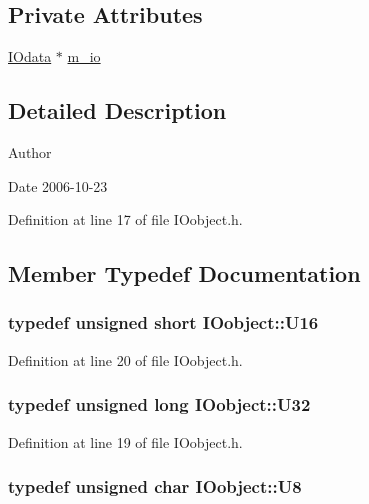 \subsection*{Private Attributes}
\begin{DoxyCompactItemize}
\item 
\hyperlink{classIOdata}{IOdata} $\ast$ \hyperlink{classIOobject_aa648e4128c3c37d8291d6bb26b57c504}{m\_\-io}
\end{DoxyCompactItemize}


\subsection{Detailed Description}
\begin{DoxyAuthor}{Author}

\end{DoxyAuthor}
\begin{DoxyDate}{Date}
2006-\/10-\/23 
\end{DoxyDate}


Definition at line 17 of file IOobject.h.

\subsection{Member Typedef Documentation}
\hypertarget{classIOobject_a260583f7e496b1979cb75adc9bbb7fc4}{
\subsubsection[{U16}]{\setlength{\rightskip}{0pt plus 5cm}typedef unsigned short {\bf IOobject::U16}}}
\label{classIOobject_a260583f7e496b1979cb75adc9bbb7fc4}


Definition at line 20 of file IOobject.h.\hypertarget{classIOobject_ad5bc21e44080074fe1068dc83861a090}{
\subsubsection[{U32}]{\setlength{\rightskip}{0pt plus 5cm}typedef unsigned long {\bf IOobject::U32}}}
\label{classIOobject_ad5bc21e44080074fe1068dc83861a090}


Definition at line 19 of file IOobject.h.\hypertarget{classIOobject_a14ca3894cb3b023d2a0b2d088fddfc90}{
\subsubsection[{U8}]{\setlength{\rightskip}{0pt plus 5cm}typedef unsigned char {\bf IOobject::U8}}}
\label{classIOobject_a14ca3894cb3b023d2a0b2d088fddfc90}


